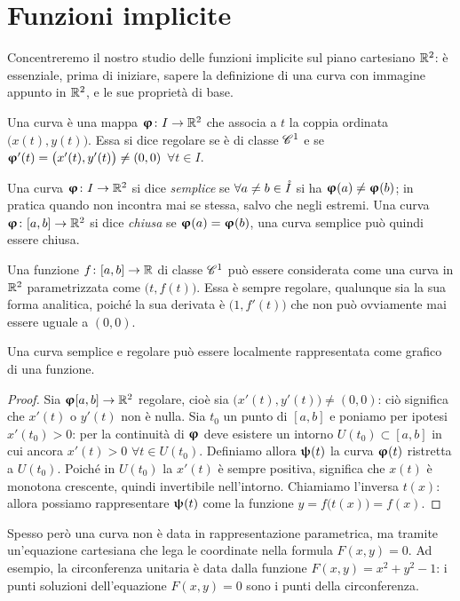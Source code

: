 \chapter{Funzioni implicite}
Concentreremo il nostro studio delle funzioni implicite sul piano cartesiano $\R^2$: è essenziale, prima di iniziare, sapere la definizione di una curva con immagine appunto in $\R^2$, e le sue proprietà di base.
\begin{definizione}
	Una curva è una mappa $\vphi\colon I\to\R^2$ che associa a $t$ la coppia ordinata $\big(x(t),y(t)\big)$.
	Essa si dice regolare se è di classe $\cclass[1]$ e se $\vphi'(t)=\big(x'(t),y'(t)\big)\neq(0,0)$ $\forall t\in I$.
\end{definizione}
\begin{definizione}
	Una curva $\vphi\colon I\to\R^2$ si dice \emph{semplice} se $\forall a\neq b\in \interior{I}$ si ha $\vphi(a)\neq\vphi(b)$; in pratica quando non incontra mai se stessa, salvo che negli estremi.
	Una curva $\vphi\colon [a,b]\to\R^2$ si dice \emph{chiusa} se $\vphi(a)=\vphi(b)$, una curva semplice può quindi essere chiusa.
\end{definizione}
Una funzione $f\colon[a,b]\to\R$ di classe $\cclass[1]$ può essere considerata come una curva in $\R^2$ parametrizzata come $\big(t,f(t)\big)$.
Essa è sempre regolare, qualunque sia la sua forma analitica, poiché la sua derivata è $\big(1,f'(t)\big)$ che non può ovviamente mai essere uguale a $(0,0)$.
\begin{osservazione}
	Una curva semplice e regolare può essere localmente rappresentata come grafico di una funzione.
\end{osservazione}
\begin{proof}
	Sia $\vphi[a,b]\to\R^2$ regolare, cioè sia $\big(x'(t),y'(t)\big)\neq(0,0)$: ciò significa che $x'(t)$ o $y'(t)$ non è nulla.
	Sia $t_0$ un punto di $[a,b]$ e poniamo per ipotesi $x'(t_0)>0$: per la continuità di $\vphi$ deve esistere un intorno $U(t_0)\subset[a,b]$ in cui ancora $x'(t)>0$ $\forall t\in U(t_0)$.
	Definiamo allora $\vpsi(t)$ la curva $\vphi(t)$ ristretta a $U(t_0)$.
	Poiché in $U(t_0)$ la $x'(t)$ è sempre positiva, significa che $x(t)$ è monotona crescente, quindi invertibile nell'intorno.
	Chiamiamo l'inversa $t(x)$: allora possiamo rappresentare $\vpsi(t)$ come la funzione $y=f\big(t(x)\big)=f(x)$.
\end{proof}
Spesso però una curva non è data in rappresentazione parametrica, ma tramite un'equazione cartesiana che lega le coordinate nella formula $F(x,y)=0$.
Ad esempio, la circonferenza unitaria è data dalla funzione $F(x,y)=x^2+y^2-1$: i punti soluzioni dell'equazione $F(x,y)=0$ sono i punti della circonferenza.
